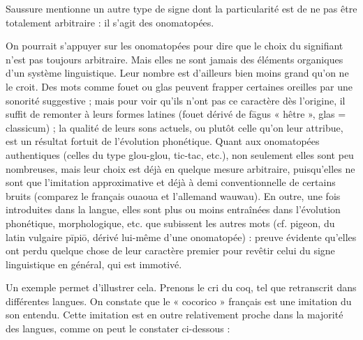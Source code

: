 Saussure mentionne un autre type de signe dont la particularité est de ne pas être totalement arbitraire : il s’agit des onomatopées.
\begin{lecture}{}
On pourrait s’appuyer sur les onomatopées pour dire que le choix du signifiant n’est pas toujours arbitraire. Mais elles ne sont jamais des éléments organiques d’un système linguistique. Leur nombre est d’ailleurs bien moins grand qu’on ne le croit. Des mots comme fouet ou glas peuvent frapper certaines oreilles par une sonorité suggestive ; mais pour voir qu’ils n’ont pas ce caractère dès l’origine, il suffit de remonter à leurs formes latines (fouet dérivé de fāgus « hêtre », glas = classicum) ; la qualité de leurs sons actuels, ou plutôt celle qu’on leur attribue, est un résultat fortuit de l’évolution phonétique. Quant aux onomatopées authentiques (celles du type glou-glou, tic-tac, etc.), non seulement elles sont peu nombreuses, mais leur choix est déjà en quelque mesure arbitraire, puisqu’elles ne sont que l’imitation approximative et déjà à demi conventionnelle de certains bruits (comparez le français ouaoua et l’allemand wauwau). En outre, une fois introduites dans la langue, elles sont plus ou moins entraînées dans l’évolution phonétique, morphologique, etc. que subissent les autres mots (cf. pigeon, du latin vulgaire pīpiō, dérivé lui-même d’une onomatopée) : preuve évidente qu’elles ont perdu quelque chose de leur caractère premier pour revêtir celui du signe linguistique en général, qui est immotivé.
\end{lecture}
Un exemple permet d’illustrer cela. Prenons le cri du coq, tel que retranscrit dans différentes langues. On constate que le « cocorico » français est une imitation du son entendu. Cette imitation est en outre relativement proche dans la majorité des langues, comme on peut le constater ci-dessous :

